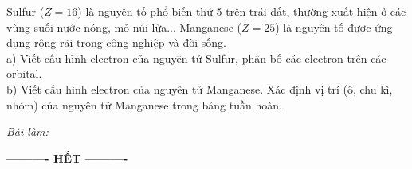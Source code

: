 \documentclass[11pt,a4paper]{article}
\begin{document}
\begin{ex}
Sulfur ($Z = 16$) là nguyên tố phổ biến thứ 5 trên trái đất, thường xuất hiện ở các vùng suối nước nóng, mỏ núi lửa... Manganese ($Z = 25$) là nguyên tố được ứng dụng rộng rãi trong công nghiệp và đời sống.\\
a) Viết cấu hình electron của nguyên tử Sulfur, phân bố các electron trên các orbital.\\
b) Viết cấu hình electron của nguyên tử Manganese. Xác định vị trí (ô, chu kì, nhóm) của nguyên tử Manganese trong bảng tuần hoàn.

\vspace{1pt}
\noindent\textit{Bài làm:}\\
\end{ex}
\vspace{4pt}
\begin{center}
\textbf{---------- HẾT ----------}
\end{center}
\end{document}
